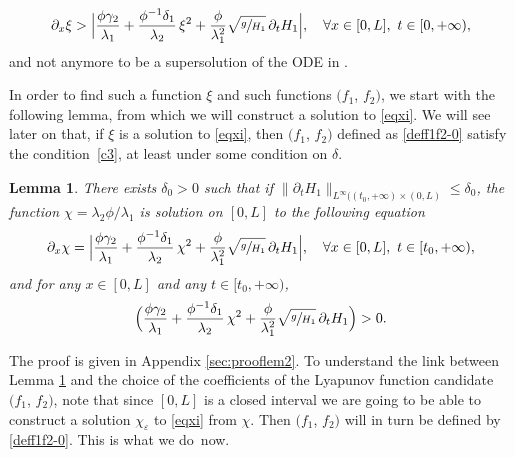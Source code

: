 \documentclass[11pt]{article}
\numberwithin{equation}{section}
\newtheorem{lem}[thm]{Lemma}
\theoremstyle{definition}
\begin{document}
\begin{equation}
\label{eqxi}
\partial_{x}\xi >\Bigl|\frac{\phi\gamma_{2}}{\lambda_{1}}+\frac{\phi^{-1}\delta_{1}}{\lambda_{2}}\,\xi^{2}+{\frac{\phi}{\lambda_{1}^{2}}}\sqrt{\sfrac{g}{H_{1}}}\,\partial_{t} H_{1}\Bigr|,\quad \forall x\in[0,L],\ t\in[0,+\infty),
\end{equation}
and not anymore to be a supersolution of the ODE in \cite{BastinCoron22}.

In order to find such {a function $\xi$ and such functions $(f_{1}$, $f_{2})$, we start with} the following lemma, {from which we will construct a solution to \eqref{eqxi}. We will see later on that, if $\xi$ is a solution to \eqref{eqxi}, then $(f_{1}$, $f_{2})$ defined as \eqref{deff1f2-0} satisfy the condition~\eqref{c3}, at least under some condition on $\delta$.}
\begin{lem}
There exists $\delta_{0}>0$ such that if $\lVert\partial_{t}H_{1}\rVert_{L^{\infty}(({t_{0}},+\infty)\times(0,L)}\leq \delta_{0}$,
the function $\chi={\lambda_{2}\phi}/\lambda_{1}$ is solution on $[0,L]$ to the following equation
\begin{equation}
\partial_{x}\chi
=\Bigl|\frac{\phi\gamma_{2}}{\lambda_{1}}+\frac{\phi^{-1}\delta_{1}}{\lambda_{2}}\,\chi^{2}+{\frac{\phi}{\lambda_{1}^{2}}}\sqrt{\sfrac{g}{H_{1}}}\,\partial_{t} H_{1}\Bigr|, \quad\forall x\in[0,L],\ t\in[{t_{0}},+\infty),
\label{eqg}
\end{equation}
and for any $x\in[0,L]$ and any $t\in[{t_{0}},+\infty)$,
\begin{equation}
\Bigl(\frac{\phi\gamma_{2}}{\lambda_{1}}+\frac{\phi^{-1}\delta_{1}}{\lambda_{2}}\,\chi^{2}+{\frac{\phi}{\lambda_{1}^{2}}}\sqrt{\sfrac{g}{H_{1}}}\,\partial_{t} H_{1}\Bigr)>0.
\label{positivity}
\end{equation}
\label{lem2}
\end{lem}
The proof is given in Appendix {\ref{sec:prooflem2}}.
To understand the link between Lemma \ref{lem2} {and the choice of the coefficients of the Lyapunov function candidate $(f_{1}$, $f_{2})$, note that since $[0,L]$ is a closed interval we are going to be able to construct a solution $\chi_{\varepsilon}$ to \eqref{eqxi} from $\chi$. Then $(f_{1}$, $f_{2})$ will in turn be defined by \eqref{deff1f2-0}. This is what we do~now.}
\end{document}
